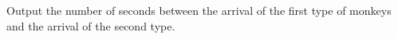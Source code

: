 Output the number of seconds between the arrival of the first type of monkeys and the arrival of the second type.  

\